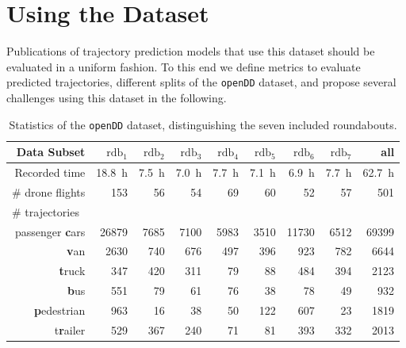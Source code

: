 \documentclass[a4paper, 10pt, conference]{ieeeconf}      %
\begin{document}
\section{Using the Dataset} \label{sec:Challenges}
Publications of trajectory prediction models that use this dataset should be evaluated in a uniform fashion.
To this end we define metrics to evaluate predicted trajectories, different splits of the \texttt{openDD} dataset, and propose several challenges using this dataset in the following.

\begin{table}[t]
  \caption{Statistics of the \texttt{openDD} dataset, distinguishing the seven included roundabouts.} \label{tab:datasetOverview}
  \begin{center}
\begin{tabular}{r|r|r|r|r|r|r|r||r}
    Data Subset & $\text{rdb}_1$ & $\text{rdb}_2$ & $\text{rdb}_3$ & $\text{rdb}_4$ & $\text{rdb}_5$ & $\text{rdb}_6$ & $\text{rdb}_7$ & all \\
    \hline
    \hline
    Recorded time & \SI{18,8}{\hour} & \SI{7,5}{\hour} & \SI{7,0}{\hour} & \SI{7,7}{\hour} & \SI{7,1}{\hour} & \SI{6,9}{\hour} & \SI{7,7}{\hour} & \SI{62,7}{\hour} \\
    \hline
    \hline
    \# drone flights & \SI{153}{} & \SI{56}{} & \SI{54}{} & \SI{69}{} & \SI{60}{} & \SI{52}{} & \SI{57}{} & \SI{501}{} \\
    \hline
    \hline
    \multicolumn{1}{l|}{\# trajectories} & & & & & & & & \\
    passenger \textbf{c}ars & \SI{26879}{} & \SI{7685}{} & \SI{7100}{} & \SI{5983}{} & \SI{3510}{} & \SI{11730}{} & \SI{6512}{} & \SI{69399}{} \\
                    \textbf{v}an & \SI{2630}{} & \SI{740}{} & \SI{676}{} & \SI{497}{} & \SI{396}{} & \SI{923}{} & \SI{782}{} & \SI{6644}{} \\
                    \textbf{t}ruck & \SI{347}{} & \SI{420}{} & \SI{311}{} & \SI{79}{} & \SI{88}{} & \SI{484}{} & \SI{394}{} & \SI{2123}{} \\
                        \textbf{b}us & \SI{551}{} & \SI{79}{} & \SI{61}{} & \SI{76}{} & \SI{38}{} & \SI{78}{} & \SI{49}{} & \SI{932}{} \\
                \textbf{p}edestrian & \SI{963}{} & \SI{16}{} & \SI{38}{} & \SI{50}{} & \SI{122}{} & \SI{607}{} & \SI{23}{} & \SI{1819}{} \\
                        t\textbf{r}ailer & \SI{529}{} & \SI{367}{} & \SI{240}{} & \SI{71}{} & \SI{81}{} & \SI{393}{} & \SI{332}{} & \SI{2013}{} \\

\end{tabular}
\end{center}
\end{table}
\end{document}
